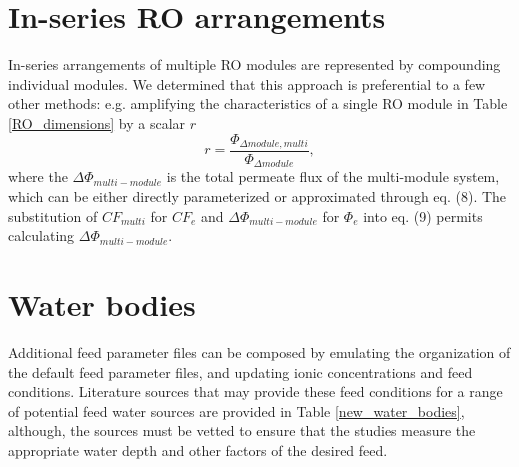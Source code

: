 \documentclass[fleqn,10pt]{wlscirep}
\begin{document}
\section{In-series RO arrangements}

In-series arrangements of multiple RO modules are represented by compounding individual modules. We determined that this approach is preferential to a few other methods: e.g. amplifying the characteristics of a single RO module in Table \ref{RO_dimensions} by a scalar $r$
\begin{equation}
    r=\frac{\Phi_{\Delta module,multi}}{\Phi_{\Delta module}},
\end{equation}
where the $\Delta \Phi_{multi-module}$ is the total permeate flux of the multi-module system, which can be either directly parameterized or approximated through eq. (8). The substitution of $CF_{multi}$ for $CF_e$ and $\Delta \Phi_{multi-module}$ for $\Phi_e$ into eq. (9) permits calculating $\Delta \Phi_{multi-module}$. 

\section{Water bodies}

Additional feed parameter files can be composed by emulating the organization of the default feed parameter files, and updating ionic concentrations and feed conditions. Literature sources that may provide these feed conditions for a range of potential feed water sources are provided in Table \ref{new_water_bodies}, although, the sources must be vetted to ensure that the studies measure the appropriate water depth and other factors of the desired feed. 
\end{document}
